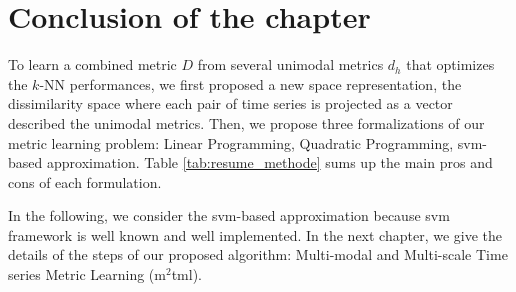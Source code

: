 \newpage
\section{Conclusion of the chapter}
To learn a combined metric $D$ from several unimodal metrics $d_h$ that optimizes the $k$-NN performances, we first proposed a new space representation, the dissimilarity space where each pair of time series is projected as a vector described the unimodal metrics. Then, we propose three formalizations of our metric learning problem: Linear Programming, Quadratic Programming, {\sc svm}-based approximation. Table \ref{tab:resume_methode} sums up the main pros and cons of each formulation.

\begin{table}[h!]
	\small
	\centering
	\renewcommand{\arraystretch}{0.85}
		\caption{The different formalizations for Metric Learning in Dissimilarity space}
		\label{tab:resume_methode}
\end{table}
  
In the following, we consider the {\sc svm}-based approximation because {\sc svm} framework is well known and well implemented. In the next chapter, we give the details of the steps of our proposed algorithm: Multi-modal and Multi-scale Time series Metric Learning ({\sc m}$^2${\sc tml}).

